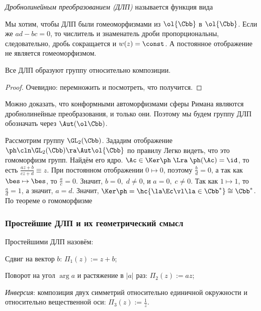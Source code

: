 \documentclass[a4paper]{article}
\begin{document}
\begin{df} \emph{Дробно\д линейным преобразованием (ДЛП)} называется функция
вида
\end{df}

\begin{note}
Мы хотим, чтобы ДЛП были гомеоморфизмами из $\ol{\Cbb}$ в $\ol{\Cbb}$. Если же $ad - bc = 0$, то числитель и
знаменатель дроби пропорциональны, следовательно, дробь сокращается и $w(z) = \const$. А постоянное отображение
не является гомеоморфизмом.
\end{note}

\begin{theorem}
Все ДЛП образуют группу относительно композиции.
\end{theorem}
\begin{proof}
Очевидно: перемножить и посмотреть, что получится.
\end{proof}

Можно доказать, что конформными автоморфизмами сферы Римана являются дробно\д линейные преобразования, и только они.
Поэтому мы будем группу ДЛП обозначать через $\Aut(\ol\Cbb)$.

Рассмотрим группу $\GL_2(\Cbb)$. Зададим отображение $\ph\cln \GL_2(\Cbb) \ra \Aut \ol{\Cbb}$ по правилу
 Легко видеть, что это гомоморфизм групп.
Найдём его ядро. $\Ac \in \Ker \ph \; \Lra \; \ph(\Ac) = \id$, то есть $\frac{az + b}{cz + d} \equiv z$.
При постоянном отображении $0 \mapsto 0$, поэтому $\frac{b}{d} = 0$, а так как $\bes \mapsto \bes$,
то $\frac{a}{c} = 0$. Значит, $b = 0, \; d \neq 0$, и $a = 0, \; c \neq 0$. Так
как $1 \mapsto 1$, то $\frac{a}{d}=1$, а значит, $a=d$.
Значит, $\Ker \ph = \hc{\la \Ec \vl \la \in \Cbb^*} \cong \Cbb^*$. По теореме о гомоморфизме

\subsubsection{Простейшие ДЛП и их геометрический смысл}

\begin{df}
Простейшими ДЛП назовём:
\begin{nums}{-2}
\item Сдвиг на вектор $b$: $\Pi_1(z) := z + b$;
\item Поворот на угол $\arg a$ и растяжение в $|a|$ раз: $\Pi_2(z) := az$;
\item \emph{Инверсия}: композиция двух симметрий относительно единичной окружности и относительно вещественной оси:
$\Pi_3(z) := \frac{1}{z}$.
\end{nums}
\end{df}
\end{document}
